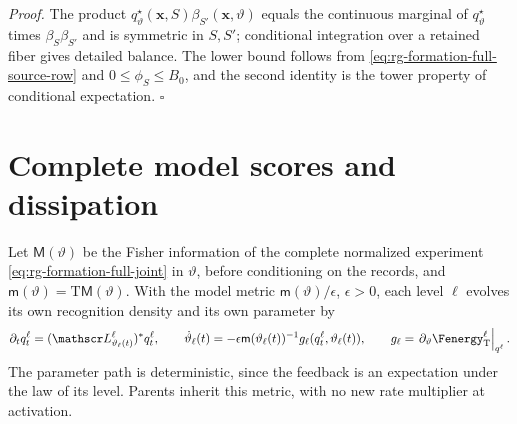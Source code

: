 \noindent\emph{Proof.}
The product \(q^\star_\vartheta(\mathbf x,S)\beta_{S'}(\mathbf x,\vartheta)\)
equals the continuous marginal of \(q^\star_\vartheta\) times
\(\beta_S\beta_{S'}\) and is symmetric in \(S,S'\); conditional integration
over a retained fiber gives detailed balance. The lower bound follows from
\cref{eq:rg-formation-full-source-row} and \(0\le\phi_S\le B_0\), and the
second identity is the tower property of conditional expectation. \(\square\)

\section{Complete model scores and dissipation}
\label{sec:rg-formation-learning}

Let \(\mathsf M(\vartheta)\) be the Fisher information of the complete
normalized experiment \cref{eq:rg-formation-full-joint} in \(\vartheta\),
before conditioning on the records, and \(\mathsf m(\vartheta)=
\mathrm T\mathsf M(\vartheta)\). With the model metric
\(\mathsf m(\vartheta)/\epsilon\), \(\epsilon>0\), each level \(\ell\) evolves
its own recognition density and its own parameter by
\begin{equation}
\partial_tq_t^\ell=(\mathscr L_{\vartheta_\ell(t)}^\ell)^*q_t^\ell,
\qquad
\dot\vartheta_\ell(t)
  =-\epsilon \mathsf m(\vartheta_\ell(t))^{-1}
        g_\ell(q_t^\ell,\vartheta_\ell(t)),
\qquad
g_\ell=\left.\partial_\vartheta\Fenergy_{\mathrm T}^\ell\right|_{q^\ell}.
\label{eq:rg-formation-own-law-dynamics}
\end{equation}
The parameter path is deterministic, since the feedback is an expectation
under the law of its level. Parents inherit this metric, with no new rate
multiplier at activation.

